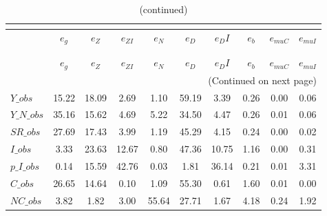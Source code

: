  
\begin{center}
\begin{longtable}{lccccccccc} 
\caption{VARIANCE DECOMPOSITION (in percent)}\\
 \label{Table:th_var_decomp_uncond}\\
\toprule 
$               $	 & 	 $        {e_g}$	 & 	 $        {e_Z}$	 & 	 $     {e_{ZI}}$	 & 	 $        {e_N}$	 & 	 $        {e_D}$	 & 	 $       {e_DI}$	 & 	 $        {e_b}$	 & 	 $    {e_{muC}}$	 & 	 $    {e_{muI}}$\\
\midrule \endfirsthead 
\caption{(continued)}\\
 \toprule \\ 
$               $	 & 	 $        {e_g}$	 & 	 $        {e_Z}$	 & 	 $     {e_{ZI}}$	 & 	 $        {e_N}$	 & 	 $        {e_D}$	 & 	 $       {e_DI}$	 & 	 $        {e_b}$	 & 	 $    {e_{muC}}$	 & 	 $    {e_{muI}}$\\
\midrule \endhead 
\midrule \multicolumn{10}{r}{(Continued on next page)} \\ \bottomrule \endfoot 
\bottomrule \endlastfoot 
$Y\_obs         $	 & 	        15.22	 & 	        18.09	 & 	         2.69	 & 	         1.10	 & 	        59.19	 & 	         3.39	 & 	         0.26	 & 	         0.00	 & 	         0.06 \\ 
$Y\_N\_obs      $	 & 	        35.16	 & 	        15.62	 & 	         4.69	 & 	         5.22	 & 	        34.50	 & 	         4.47	 & 	         0.26	 & 	         0.01	 & 	         0.06 \\ 
$SR\_obs        $	 & 	        27.69	 & 	        17.43	 & 	         3.99	 & 	         1.19	 & 	        45.29	 & 	         4.15	 & 	         0.24	 & 	         0.00	 & 	         0.02 \\ 
$I\_obs         $	 & 	         3.33	 & 	        23.63	 & 	        12.67	 & 	         0.80	 & 	        47.36	 & 	        10.75	 & 	         1.16	 & 	         0.00	 & 	         0.31 \\ 
$p\_I\_obs      $	 & 	         0.14	 & 	        15.59	 & 	        42.76	 & 	         0.03	 & 	         1.81	 & 	        36.14	 & 	         0.21	 & 	         0.01	 & 	         3.31 \\ 
$C\_obs         $	 & 	        26.65	 & 	        14.64	 & 	         0.10	 & 	         1.09	 & 	        55.30	 & 	         0.61	 & 	         1.60	 & 	         0.01	 & 	         0.00 \\ 
$NC\_obs        $	 & 	         3.82	 & 	         1.82	 & 	         3.00	 & 	        55.64	 & 	        27.71	 & 	         1.67	 & 	         4.18	 & 	         0.24	 & 	         1.92 \\ 

\end{longtable}
\end{center}
